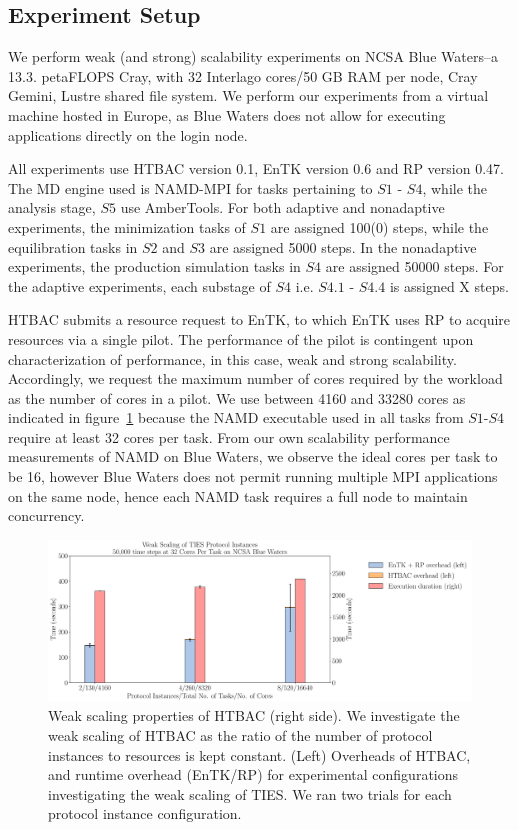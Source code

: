 \subsection{Experiment Setup}\label{ssec:exp_design}

We perform weak (and strong) scalability experiments on NCSA Blue Waters--a 13.3. petaFLOPS Cray, with 32 Interlago cores/50 GB RAM per node, Cray Gemini, Lustre shared file system. We perform our
experiments from a virtual machine hosted in Europe, as Blue
Waters does not allow for executing applications directly on
the login node.

All experiments use HTBAC version 0.1, EnTK version 0.6 and RP
version 0.47. The MD engine used is NAMD-MPI for tasks pertaining to $S1$ - $S4$, while the analysis stage, $S5$ use AmberTools. For both adaptive and nonadaptive experiments, the minimization
tasks of $S1$ are assigned 100(0) steps, while the equilibration
tasks in $S2$ and $S3$ are assigned 5000 steps. In the nonadaptive experiments, the production
simulation tasks in $S4$ are assigned 50000 steps. For the
adaptive experiments, each substage of $S4$ i.e. $S4.1$ - $S4.4$ is assigned X steps.

HTBAC submits a resource request to EnTK, to which EnTK uses
RP to acquire resources via a single pilot. The performance of
the pilot is contingent upon characterization of
performance, in this case, weak and strong scalability. Accordingly, we request the maximum number of cores required
by the workload as the number of cores in a pilot. We use between
4160 and 33280 cores as indicated in figure~\ref{fig:weak_scaling}
because the NAMD executable used in all tasks from $S1$-$S4$ require at
least 32 cores per task. From our own scalability performance measurements of
NAMD on Blue Waters, we observe the ideal cores per task to be 16,
however Blue Waters does not permit running multiple MPI applications on the same node,
hence each NAMD task requires a full node to maintain concurrency.

\begin{figure}
  \centering
   \includegraphics[width=\columnwidth]{./figures/weak_scaling_TIES_instances_50,000_timesteps.pdf}
  \caption{Weak scaling properties of HTBAC (right side). We investigate the
  weak scaling of HTBAC as the ratio of the number of protocol instances to
  resources is kept constant. (Left) Overheads of HTBAC, and runtime overhead (EnTK/RP) for
  experimental configurations investigating the weak scaling of TIES. We ran two trials for each protocol instance configuration.}
\label{fig:weak_scaling}
\end{figure}



